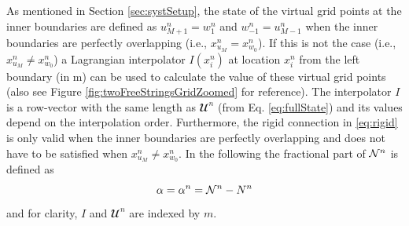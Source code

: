 As mentioned in Section \ref{sec:systSetup}, the state of the virtual grid points at the inner boundaries are defined as $u_{M+1}^n = w_1^n$ and $w_{-1}^n = u_{M-1}^n$ when the inner boundaries are perfectly overlapping  (i.e., $x^n_{u_M} = x^n_{w_0}$). If this is not the case (i.e., $x^n_{u_M} \neq x^n_{w_0}$) a Lagrangian interpolator $I(x_i^n)$ at location $x_i^n$ from the left boundary (in m) can be used to calculate the value of these virtual grid points (also see Figure \ref{fig:twoFreeStringsGridZoomed} for reference). The interpolator $I$ is a row-vector with the same length as $\mathbfcal{U}^n$ (from Eq. \eqref{eq:fullState}) and its values depend on the interpolation order. Furthermore, the rigid connection in \eqref{eq:rigid} is only valid when the inner boundaries are perfectly overlapping and does not have to be satisfied when $x_{u_M}^n \neq x_{w_0}^n$. In the following the fractional part of $\mathcal{N}^n$ %
is defined as 
\begin{equation}\label{eq:alphaDef}
    \alpha = \alpha^n = \Nfrac^n - N^n %
\end{equation}
 and for clarity, $I$ and $\mathbfcal{U}^n$ are indexed by $m$.
